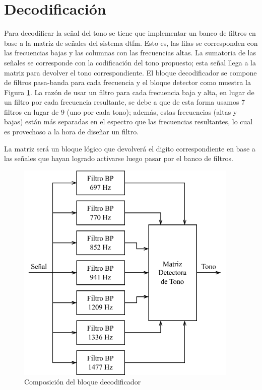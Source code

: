 \section{Decodificación}
Para decodificar la señal del tono se tiene que implementar un banco de filtros en base a la matriz de señales del sistema \gls{dtfm}. Esto es, las filas se corresponden con las frecuencias bajas y las columnas con las frecuencias altas. La sumatoria de las señales se corresponde con la codificación del tono propuesto; esta señal llega a la matriz para devolver el tono correspondiente. El bloque decodificador se compone de filtros pasa-banda para cada frecuencia y el bloque detector como muestra la Figura \ref{fig:diagrama_bloques_decod}. La razón de usar un filtro para cada frecuencia baja y alta, en lugar de un filtro por cada frecuencia resultante, se debe a que de esta forma usamos 7 filtros en lugar de 9 (uno por cada tono); además, estas frecuencias (altas y bajas) están más separadas en el espectro que las frecuencias resultantes, lo cual es provechoso a la hora de diseñar un filtro.

La matriz será un bloque lógico que devolverá el digito correspondiente en base a las señales que hayan logrado activarse luego pasar por el banco de filtros.

\begin{figure}[H]
  \centering
  \includegraphics[width=300pt]{images/planteamiento/decodificador.png}
  \caption{Composición del bloque decodificador}
  \label{fig:diagrama_bloques_decod}
\end{figure}

